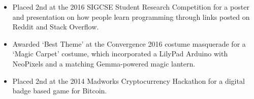 \documentclass[../main.tex]{subfiles}
\begin{document}
\begin{itemize}
		\item{Placed 2nd at the 2016 SIGCSE Student Research Competition for a poster and presentation on how people learn programming through links posted on Reddit and Stack Overflow.}
		\item{Awarded `Best Theme' at the Convergence 2016 costume masquerade for a `Magic Carpet' costume, which incorporated a LilyPad Arduino with NeoPixels and a matching Gemma-powered magic lantern.}
		\item{Placed 2nd at the 2014 Madworks Cryptocurrency Hackathon for a digital badge based game for Bitcoin.}
\end{itemize}
\end{document}
